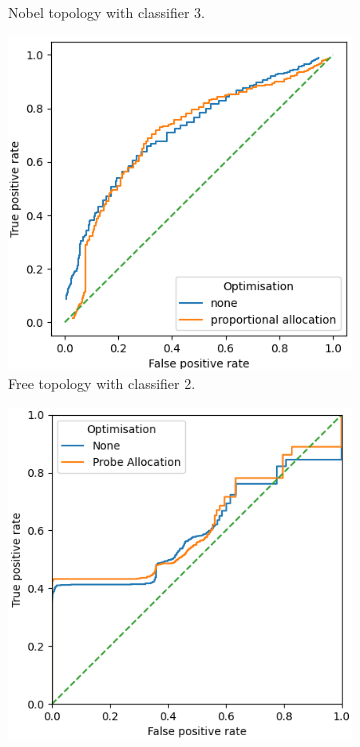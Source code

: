 \begin{figure}[H]
\begin{subfigure}[H]{0.475\textwidth}
        \caption{Nobel topology with classifier 3.}
    \end{subfigure}
    \begin{subfigure}[H]{0.475\textwidth}
        \includegraphics[width=\textwidth]{figs/results/france_ac2_opt.png}
        \caption{Free topology with classifier 2.}
    \end{subfigure}
    \begin{subfigure}[H]{0.475\textwidth}
        \includegraphics[width=\textwidth]{figs/results/france_ac3_opt.png}

\end{subfigure}
\end{figure}
